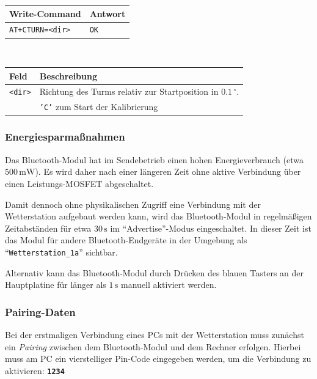         \begin{table}[H]
            \centering
            \begin{tabular}{|p{}|p{}|}
                \hline
                \textbf{Write-Command} &\textbf{Antwort} \\
                \hline
                \texttt{AT+CTURN=<dir>} & \texttt{OK}\\
                \hline
            \end{tabular}\\[3mm]
            \begin{tabular}{|p{}|p{}|}
                \hline
                \textbf{Feld}       & \textbf{Beschreibung}\\
                \hline
                \texttt{<dir>}      & Richtung des Turms relativ zur Startposition in $0.1\,^\circ$.\\
                                    & \texttt{'C'} zum Start der Kalibrierung\\
                \hline
            \end{tabular}
        \end{table}
    
        \subsubsection{Energiesparmaßnahmen}
        Das Bluetooth-Modul hat im Sendebetrieb einen hohen Energieverbrauch (etwa $500\,\mathrm{mW}$). Es wird daher nach einer längeren Zeit ohne aktive Verbindung über einen Leistungs-MOSFET abgeschaltet.
        
        Damit dennoch ohne physikalischen Zugriff eine Verbindung mit der Wetterstation aufgebaut werden kann, wird das Bluetooth-Modul in regelmäßigen Zeitabständen für etwa $30\,\mathrm{s}$ im ``Advertise''-Modus eingeschaltet. In dieser Zeit ist das Modul für andere Bluetooth-Endgeräte in der Umgebung als ``\texttt{Wetterstation\_1a}'' sichtbar.
        
        Alternativ kann das Bluetooth-Modul durch Drücken des blauen Tasters an der Hauptplatine für länger als $1\,\mathrm{s}$ manuell aktiviert werden.
           
        \subsubsection{Pairing-Daten}
        Bei der erstmaligen Verbindung eines PCs mit der Wetterstation muss zunächst ein \emph{Pairing} zwischen dem Bluetooth-Modul und dem Rechner erfolgen. Hierbei muss am PC ein vierstelliger Pin-Code eingegeben werden, um die Verbindung zu aktivieren: \textbf{\texttt{1234}}
    
